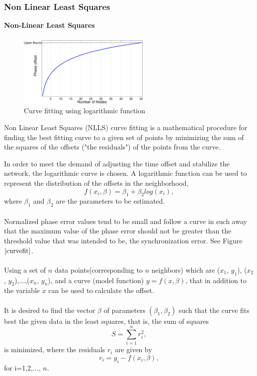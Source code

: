\documentclass[a4paper,10pt]{report}
\begin{document}
\subsubsection{Non Linear Least Squares}
\textbf{Non-Linear Least Squares} \paragraph*{}
\begin{figure}[b]
\centering
\includegraphics[width=2.5in]{curvefit}
\caption{Curve fitting using logarithmic function} \label{curvefit}
\end{figure}
Non Linear Least Squares (NLLS) curve fitting  is a mathematical procedure for finding the best fitting curve to a given set of points by
minimizing the sum of the squares of the offsets ("the residuals")
of the points from the curve. \par
In order to meet the demand of adjusting the time offset and stabilize the network, the logarithmic curve is chosen. A logarithmic function can be used to represent the distribution of the offsets in the neighborhood,
\begin{equation}
 f(x_i,\beta)= \beta _1 + \beta_2log(x_i),
\end{equation}
where $\beta_1$ and $\beta_2$ are the parameters to be estimated.\paragraph*{}
Normalized phase error values tend to be small and follow a curve in such away that the maximum value of the phase error should not be greater than the threshold value that was intended to be, the synchronization error. See Figure $\ref{curvefit}$.
\paragraph*{}
Using a set of $n$ data points(corresponding to $n$ neighbors) which are ($x_1$, $y_1$),
($x_2$, $y_2$),$\dots$,($x_n$, $y_n$), and a curve (model function)
$y= f(x, \beta)$, that in addition to the variable $x$ can be used to calculate the offset.
\paragraph*{}
It is desired to find the vector $\beta$ of parameters $(\beta_1, \beta_2)$ such that the curve fits best the given data in the least squares, that is, the sum of squares
\begin{equation}
    S=\sum_{i=1}^{n}r_i^2 ,
\end{equation}
is minimized, where the residuals $r_i$ are given by
\begin{equation}
    r_i = y_i - f(x_i,\beta),
\end{equation}
for i=1,2,$\dots$, $n$.
\end{document}
